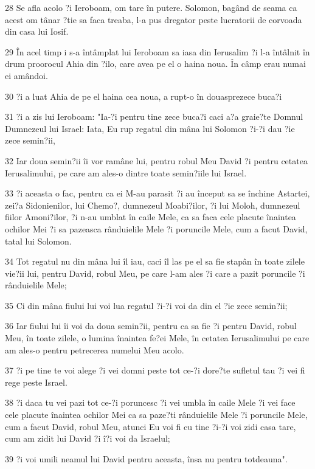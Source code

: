 \par 28 Se afla acolo ?i Ieroboam, om tare în putere. Solomon, bagând de seama ca acest om tânar ?tie sa faca treaba, l-a pus dregator peste lucratorii de corvoada din casa lui Iosif.
\par 29 În acel timp i s-a întâmplat lui Ieroboam sa iasa din Ierusalim ?i l-a întâlnit în drum proorocul Ahia din ?ilo, care avea pe el o haina noua. În câmp erau numai ei amândoi.
\par 30 ?i a luat Ahia de pe el haina cea noua, a rupt-o în douasprezece buca?i
\par 31 ?i a zis lui Ieroboam: "Ia-?i pentru tine zece buca?i caci a?a graie?te Domnul Dumnezeul lui Israel: Iata, Eu rup regatul din mâna lui Solomon ?i-?i dau ?ie zece semin?ii,
\par 32 Iar doua semin?ii îi vor ramâne lui, pentru robul Meu David ?i pentru cetatea Ierusalimului, pe care am ales-o dintre toate semin?iile lui Israel.
\par 33 ?i aceasta o fac, pentru ca ei M-au parasit ?i au început sa se închine Astartei, zei?a Sidonienilor, lui Chemo?, dumnezeul Moabi?ilor, ?i lui Moloh, dumnezeul fiilor Amoni?ilor, ?i n-au umblat în caile Mele, ca sa faca cele placute înaintea ochilor Mei ?i sa pazeasca rânduielile Mele ?i poruncile Mele, cum a facut David, tatal lui Solomon.
\par 34 Tot regatul nu din mâna lui îl iau, caci îl las pe el sa fie stapân în toate zilele vie?ii lui, pentru David, robul Meu, pe care l-am ales ?i care a pazit poruncile ?i rânduielile Mele;
\par 35 Ci din mâna fiului lui voi lua regatul ?i-?i voi da din el ?ie zece semin?ii;
\par 36 Iar fiului lui îi voi da doua semin?ii, pentru ca sa fie ?i pentru David, robul Meu, în toate zilele, o lumina înaintea fe?ei Mele, în cetatea Ierusalimului pe care am ales-o pentru petrecerea numelui Meu acolo.
\par 37 ?i pe tine te voi alege ?i vei domni peste tot ce-?i dore?te sufletul tau ?i vei fi rege peste Israel.
\par 38 ?i daca tu vei pazi tot ce-?i poruncesc ?i vei umbla în caile Mele ?i vei face cele placute înaintea ochilor Mei ca sa paze?ti rânduielile Mele ?i poruncile Mele, cum a facut David, robul Meu, atunci Eu voi fi cu tine ?i-?i voi zidi casa tare, cum am zidit lui David ?i î?i voi da Israelul;
\par 39 ?i voi umili neamul lui David pentru aceasta, însa nu pentru totdeauna".
